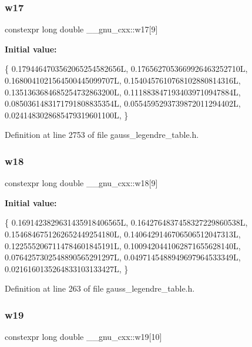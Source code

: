 \subsubsection{\texorpdfstring{w17}{w17}}
{\footnotesize\ttfamily constexpr long double \+\_\+\+\_\+gnu\+\_\+cxx\+::w17\mbox{[}9\mbox{]}}

{\bfseries Initial value\+:}
\begin{DoxyCode}
\{
    0.1794464703562065254582656L,
    0.1765627053669926463252710L,
    0.1680041021564500445099707L,
    0.1540457610768102880814316L,
    0.1351363684685254732863200L,
    0.1118838471934039710947884L,
    0.0850361483171791808835354L,
    0.0554595293739872011294402L,
    0.0241483028685479319601100L,
  \}
\end{DoxyCode}


Definition at line 2753 of file gauss\+\_\+legendre\+\_\+table.\+h.

\mbox{\label{namespace____gnu__cxx_aed43747e0c3d8ffbdc4c76d781a6857d}} 
\subsubsection{\texorpdfstring{w18}{w18}}
{\footnotesize\ttfamily constexpr long double \+\_\+\+\_\+gnu\+\_\+cxx\+::w18\mbox{[}9\mbox{]}}

{\bfseries Initial value\+:}
\begin{DoxyCode}
\{
    0.1691423829631435918406565L,
    0.1642764837458327229860538L,
    0.1546846751262652449254180L,
    0.1406429146706506512047313L,
    0.1225552067114784601845191L,
    0.1009420441062871655628140L,
    0.0764257302548890565291297L,
    0.0497145488949697964533349L,
    0.0216160135264833103133427L,
  \}
\end{DoxyCode}


Definition at line 263 of file gauss\+\_\+legendre\+\_\+table.\+h.

\mbox{\label{namespace____gnu__cxx_acad67ec3f8cfd008f39c2d7aa8532445}} 
\subsubsection{\texorpdfstring{w19}{w19}}
{\footnotesize\ttfamily constexpr long double \+\_\+\+\_\+gnu\+\_\+cxx\+::w19\mbox{[}10\mbox{]}}

